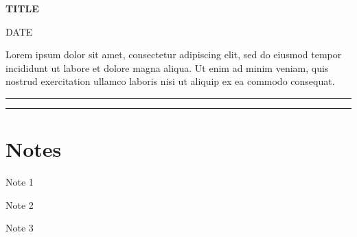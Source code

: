 \documentclass[letterpaper, 12pt, landscape]{article}
\newcommand{\mytitle}[3]{
    \begin{center}
        \huge\textbf{#1}
        
        {\Large #2}
    \end{center}
    \bigskip
    #3
    
    \noindent\rule{\textwidth}{1pt}
}
\begin{document}
    \mytitle{TITLE}{DATE}{  
        Lorem ipsum dolor sit amet, consectetur adipiscing elit, sed do eiusmod tempor incididunt ut labore et dolore magna aliqua. Ut enim ad minim veniam, quis nostrud exercitation ullamco laboris nisi ut aliquip ex ea commodo consequat.
    }
    
    \begin{paracol}{2}
        \raggedright
        

        \switchcolumn

        
    \end{paracol}
    
    \noindent\rule{\textwidth}{1pt}
    \section*{Notes}
        \raggedright
        Note 1

        Note 2

        Note 3
    
\end{document}
